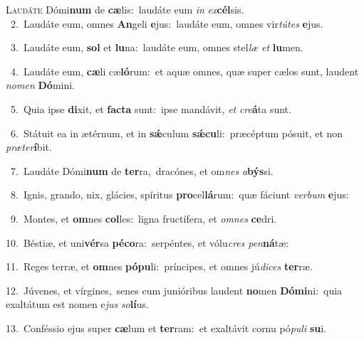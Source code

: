 \lettrine{\initial\textcolor{\initialcolor}{L}}{audáte} Dómi\textbf{num} de \textbf{cæ}\-lis:~\star laudáte eum \textit{in} \textit{ex}\-\textbf{cél}sis.\\
{\numbfont\textcolor{\numbcolor}{~2.}}~Laudáte eum, omnes \textbf{An}\-geli \textbf{e}\-jus:~\star laudáte eum, omnes vir\-\textit{tú}\-\textit{tes} \textbf{e}\-jus.\par
{\numbfont\textcolor{\numbcolor}{~3.}}~Laudáte eum, \textbf{sol} et \textbf{lu}\-na:~\star laudáte eum, omnes stel\textit{læ} \textit{et} \textbf{lu}\-men.\par
{\numbfont\textcolor{\numbcolor}{~4.}}~Laudáte eum, \textbf{cæ}\-li cæ\-\textbf{ló}\-rum:~\star et aquæ omnes, quæ super cælos sunt, laudent \textit{no}\-\textit{men} \textbf{Dó}\-mini.\par
{\numbfont\textcolor{\numbcolor}{~5.}}~Quia ipse \textbf{di}\-xit, et \textbf{fac}\-\textbf{ta} sunt:~\star ipse mandávit, \textit{et} \textit{cre}\-\textbf{á}ta sunt.\par
{\numbfont\textcolor{\numbcolor}{~6.}}~Státuit ea in ætérnum, et in \textbf{sǽ}\-culum \textbf{sǽ}\-\textbf{cu}li:~\star præcéptum pósuit, et non \textit{præ}\-\textit{ter}\textbf{í}bit.\par
{\numbfont\textcolor{\numbcolor}{~7.}}~Laudáte Dómi\textbf{num} de \textbf{ter}\-ra,~\star dracónes, et om\textit{nes} \textit{a}\-\textbf{býs}si.\par
{\numbfont\textcolor{\numbcolor}{~8.}}~Ignis, grando, nix, glácies, spíritus \textbf{pro}\-cel\-\textbf{lá}\-rum:~\star quæ fáciunt \textit{ver}\-\textit{bum} \textbf{e}\-jus:\par
{\numbfont\textcolor{\numbcolor}{~9.}}~Montes, et \textbf{om}\-nes \textbf{col}\-les:~\star ligna fructífera, et \textit{om}\-\textit{nes} \textbf{ce}\-dri.\par
{\numbfont\textcolor{\numbcolor}{10.}}~Béstiæ, et uni\-\textbf{vér}\-sa \textbf{pé}\-\textbf{co}ra:~\star serpéntes, et vólu\textit{cres} \textit{pen}\-\textbf{ná}tæ:\par
{\numbfont\textcolor{\numbcolor}{11.}}~Reges terræ, et \textbf{om}\-nes \textbf{pó}\-\textbf{pu}li:~\star príncipes, et omnes jú\-\textit{di}\-\textit{ces} \textbf{ter}\-ræ.\par
{\numbfont\textcolor{\numbcolor}{12.}}~Júvenes, et vírgines,~\dagger senes cum junióribus laudent \textbf{no}\-men \textbf{Dó}\-\textbf{mi}ni:~\star quia exaltátum est nomen e\textit{jus} \textit{so}\-\textbf{lí}us.\par
{\numbfont\textcolor{\numbcolor}{13.}}~Conféssio ejus super \textbf{cæ}\-lum et \textbf{ter}\-ram:~\star et exaltávit cornu pó\-\textit{pu}\-\textit{li} \textbf{su}\-i.\par
